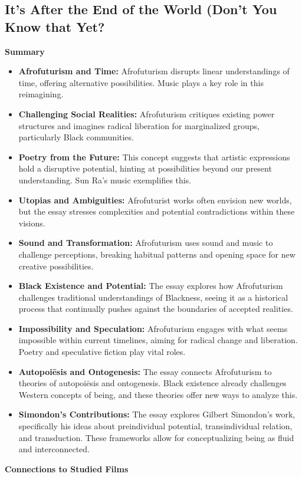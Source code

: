 \documentclass[11pt,fleqn]{book} %
\begin{document}
\subsection{It’s After the End of the World (Don’t You Know that Yet?}
\textbf{Summary}

\begin{itemize}
\item \textbf{Afrofuturism and Time:}  Afrofuturism disrupts linear understandings of time, offering alternative possibilities. Music plays a key role in this reimagining.

\item \textbf{Challenging Social Realities:} Afrofuturism critiques existing power structures and imagines radical liberation for marginalized groups, particularly Black communities.  

\item \textbf{Poetry from the Future:} This concept suggests that artistic expressions hold a disruptive potential, hinting at possibilities beyond our present understanding. Sun Ra's music exemplifies this.

\item \textbf{Utopias and Ambiguities:} Afrofuturist works often envision new worlds, but the essay stresses complexities and potential contradictions within these visions.

\item \textbf{Sound and Transformation:} Afrofuturism uses sound and music to challenge perceptions, breaking habitual patterns and opening space for new creative possibilities. 

\item \textbf{Black Existence and Potential:} The essay explores how Afrofuturism challenges traditional understandings of Blackness, seeing it as a historical process that continually pushes against the boundaries of accepted realities.

\item \textbf{Impossibility and Speculation:} Afrofuturism engages with what seems impossible within current timelines, aiming for radical change and liberation. Poetry and speculative fiction play vital roles.

\item \textbf{Autopoiēsis and Ontogenesis:} The essay connects Afrofuturism to theories of autopoiēsis and ontogenesis. Black existence already challenges Western concepts of being, and these theories offer new ways to analyze this.

\item \textbf{Simondon's Contributions:} The essay explores Gilbert Simondon's work, specifically his ideas about preindividual potential, transindividual relation, and transduction. These frameworks allow for conceptualizing being as fluid and interconnected. 
\end{itemize}
\vspace{5pt}
\textbf{Connections to Studied Films}
\end{document}
